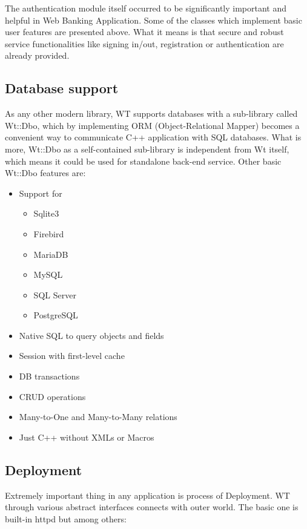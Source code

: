 \documentclass[a4paper,12pt]{book}
\newcommand\tab[1][1cm]{\hspace*{#1}}
\begin{document}
{{{The authentication module itself occurred to be significantly important and helpful in Web Banking Application. Some of the classes which implement basic user features are presented above. What it means is that secure and robust service functionalities like signing in/out, registration or authentication are already provided.

}

\subsection*{Database support}
{
\tab As any other modern library, WT supports databases with a sub-library called Wt::Dbo, which by implementing ORM (Object-Relational Mapper) becomes a convenient way to communicate C++ application with SQL databases. What is more, Wt::Dbo as a self-contained sub-library is independent from Wt itself, which means it could be used for standalone back-end service. Other basic Wt::Dbo features are: 

\begin{itemize}
	\item Support for
	\begin{itemize}
     \item Sqlite3
     \item Firebird
     \item MariaDB
     \item MySQL
     \item SQL Server
     \item PostgreSQL
     \end{itemize}
	\item Native SQL to query objects and fields
	\item Session with first-level cache
	\item DB transactions
	\item CRUD operations
	\item Many-to-One and Many-to-Many relations
	\item Just C++ without XMLs or Macros

\end{itemize}
}

\subsection*{Deployment}
{
\tab Extremely important thing in any application is process of Deployment. WT through various abstract interfaces connects with outer world. The basic one is built-in httpd but among others:

}}}
\end{document}
